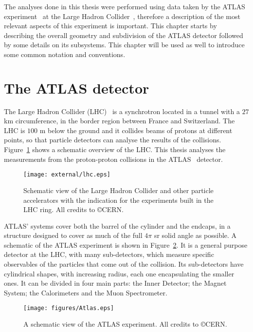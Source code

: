 
The analyses done in this thesis were performed using data taken by the ATLAS experiment~\cite{physicstdr1}
at the Large Hadron Collider~\cite{lhc}, therefore a description of the most relevant aspects of this experiment
is important.
This chapter starts by describing the overall geometry and subdivision of the ATLAS
detector followed by some details on its subsystems. This chapter will be used as well to introduce some common notation and conventions.

\section{The ATLAS detector}

The Large Hadron Collider (LHC)~\cite{lhc} is a synchrotron located in a tunnel with a $27$ km circumference, in the border region between France
and Switzerland.
The LHC is $100$ m below the ground and it collides beams of protons at different points, so that
particle detectors can analyse the results of the collisions. Figure~\ref{fig:lhc} shows a schematic overview of the LHC.
This thesis analyses the measurements from the proton-proton collisions in the ATLAS~\cite{atlastdr1,physicstdr1} detector.

\begin{figure}
\centering
\texttt{[image: external/lhc.eps]}
\caption{Schematic view of the Large Hadron Collider and other particle accelerators with the indication for the experiments built in the LHC ring. All credits to \copyright CERN.}
\label{fig:lhc}
\end{figure}

ATLAS' systems cover both the barrel of the cylinder and the endcaps, in a structure
designed to cover as much of the full $4\pi$ sr solid angle as possible.
A schematic of the ATLAS experiment is shown in Figure~\ref{fig:atlas}.
It is a general purpose detector at the LHC, with many sub-detectors, which
measure specific observables of the particles that come out of the collision.
Its sub-detectors have cylindrical shapes, with increasing radius, each one
encapsulating the smaller ones.
It can be divided in four main parts: the Inner Detector; the Magnet System;
the Calorimeters and the Muon Spectrometer.

\begin{figure}[ht]
\begin{center}
\texttt{[image: figures/Atlas.eps]}
\end{center}
\caption{A schematic view of the ATLAS experiment. All credits to \copyright CERN.}
\label{fig:atlas}
\end{figure}

